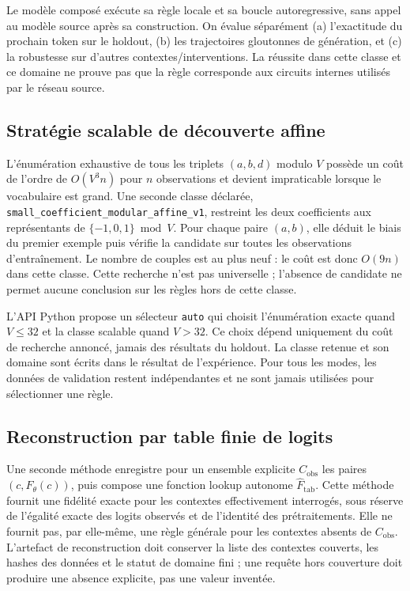 \documentclass[11pt,a4paper]{article}
\begin{document}
Le modèle composé exécute sa règle locale et sa boucle autoregressive, sans appel au modèle source après sa construction. On évalue séparément (a) l'exactitude du prochain token sur le holdout, (b) les trajectoires gloutonnes de génération, et (c) la robustesse sur d'autres contextes/interventions. La réussite dans cette classe et ce domaine ne prouve pas que la règle corresponde aux circuits internes utilisés par le réseau source.

\subsection{Stratégie scalable de découverte affine}
L'énumération exhaustive de tous les triplets $(a,b,d)$ modulo $V$ possède un coût de l'ordre de $O(V^3 n)$ pour $n$ observations et devient impraticable lorsque le vocabulaire est grand. Une seconde classe déclarée, \texttt{small\_coefficient\_modular\_affine\_v1}, restreint les deux coefficients aux représentants de $\{-1,0,1\}\bmod V$. Pour chaque paire $(a,b)$, elle déduit le biais du premier exemple puis vérifie la candidate sur toutes les observations d'entraînement. Le nombre de couples est au plus neuf : le coût est donc $O(9n)$ dans cette classe. Cette recherche n'est pas universelle ; l'absence de candidate ne permet aucune conclusion sur les règles hors de cette classe.

L'API Python propose un sélecteur \texttt{auto} qui choisit l'énumération exacte quand $V\leq 32$ et la classe scalable quand $V>32$. Ce choix dépend uniquement du coût de recherche annoncé, jamais des résultats du holdout. La classe retenue et son domaine sont écrits dans le résultat de l'expérience. Pour tous les modes, les données de validation restent indépendantes et ne sont jamais utilisées pour sélectionner une règle.

\subsection{Reconstruction par table finie de logits}
Une seconde méthode enregistre pour un ensemble explicite $C_{\mathrm{obs}}$ les paires $(c,F_\theta(c))$, puis compose une fonction lookup autonome $\widehat F_{\mathrm{tab}}$. Cette méthode fournit une fidélité exacte pour les contextes effectivement interrogés, sous réserve de l'égalité exacte des logits observés et de l'identité des prétraitements. Elle ne fournit pas, par elle-même, une règle générale pour les contextes absents de $C_{\mathrm{obs}}$. L'artefact de reconstruction doit conserver la liste des contextes couverts, les hashes des données et le statut de domaine fini ; une requête hors couverture doit produire une absence explicite, pas une valeur inventée.
\end{document}
